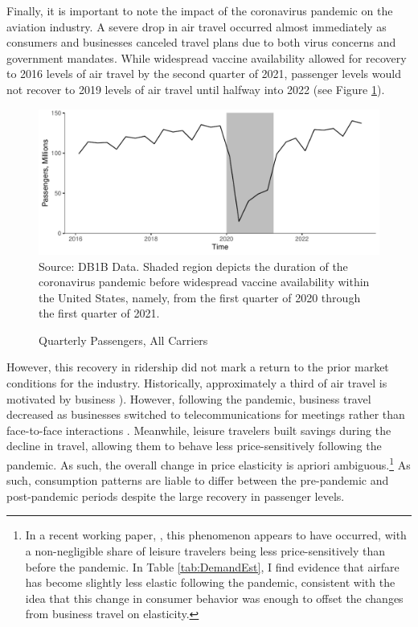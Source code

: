 \documentclass{article}
\begin{document}
	Finally, it is important to note the impact of the coronavirus pandemic on the aviation industry.  A severe drop in air travel occurred almost immediately as consumers and businesses canceled travel plans due to both virus concerns and government mandates. While widespread vaccine availability allowed for recovery to 2016 levels of air travel by the second quarter of 2021, passenger levels would not recover to 2019 levels of air travel until halfway into 2022 (see Figure \ref{fig:QuarterlyPass}). 

\begin{figure}
	\caption{Quarterly Passengers, All Carriers}
	\label{fig:QuarterlyPass}
	\includegraphics[width = \linewidth]{Quarterly_DB1B_Itineraries}
	\footnotesize{Source: DB1B Data. Shaded region depicts the duration of the coronavirus pandemic before widespread vaccine availability within the United States, namely, from the first quarter of 2020 through the first quarter of 2021.}
\end{figure}
    
	However, this recovery in ridership did not mark a return to the prior market conditions for the industry. Historically, approximately a third of air travel is motivated by business \citep{berry_tracing_2010, bet_market_2021}). However, following the pandemic, business travel decreased as businesses switched to telecommunications for meetings rather than face-to-face interactions \citep{semuels_business_2021}. Meanwhile, leisure travelers built savings during the decline in travel, allowing them to behave less price-sensitively following the pandemic. As such, the overall change in price elasticity is apriori ambiguous.\footnote{In a recent working paper, \citet{ewen_zoom_2023}, this phenomenon appears to have occurred, with a non-negligible share of leisure travelers being less price-sensitively than before the pandemic. In Table \ref{tab:DemandEst}, I find evidence that airfare has become slightly less elastic following the pandemic, consistent with the idea that this change in consumer behavior was enough to offset the changes from business travel on elasticity.}  As such, consumption patterns are liable to differ between the pre-pandemic and post-pandemic periods despite the large recovery in passenger levels. 
	
\end{document}
